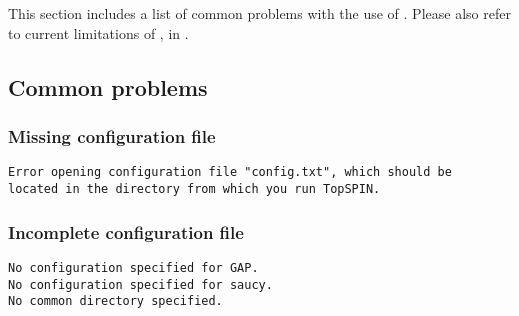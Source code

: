 \chapter{\troubleshooting}\label{chapter:troubleshooting}

This section includes a list of common problems with the use of \topspin.
Please also refer to current limitations of \topspin, in .

\section{Common problems}\label{sec:troubleshooting:common}


\subsection{Missing configuration file}


\exampleerrormessage

\begin{lstlisting}
Error opening configuration file "config.txt", which should be
located in the directory from which you run TopSPIN.
\end{lstlisting}



\subsection{Incomplete configuration file}


\exampleerrormessage

\begin{lstlisting}
No configuration specified for GAP.
No configuration specified for saucy.
No common directory specified.
\end{lstlisting}


